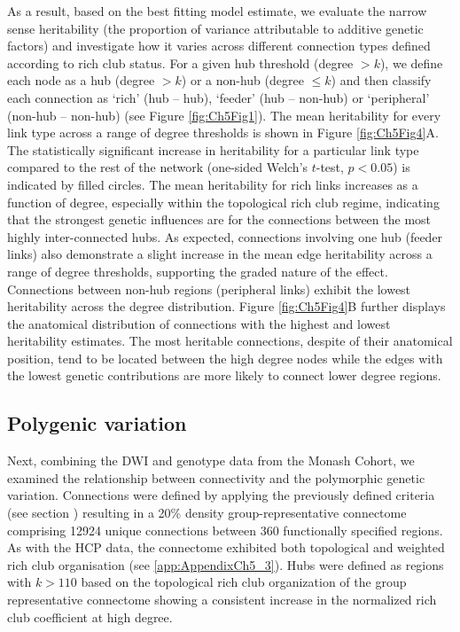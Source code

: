 As a result, based on the best fitting model estimate, we evaluate the narrow sense heritability (the proportion of variance attributable to additive genetic factors) and investigate how it varies across different connection types defined according to rich club status. For a given hub threshold (degree $> k$), we define each node as a hub (degree $> k$) or a non-hub (degree $\leq k$) and then classify each connection as `rich' (hub -- hub), `feeder' (hub -- non-hub) or `peripheral' (non-hub -- non-hub) (see Figure \ref{fig:Ch5Fig1}). The mean heritability for every link type across a range of degree thresholds is shown in Figure \ref{fig:Ch5Fig4}A. The statistically significant increase in heritability for a particular link type compared to the rest of the network (one-sided Welch’s $t$-test, $p < 0.05$) is indicated by filled circles. The mean heritability for rich links increases as a function of degree, especially within the topological rich club regime, indicating that the strongest genetic influences are for the connections between the most highly inter-connected hubs. As expected, connections involving one hub (feeder links) also demonstrate a slight increase in the mean edge heritability across a range of degree thresholds, supporting the graded nature of the effect. Connections between non-hub regions (peripheral links) exhibit the lowest heritability across the degree distribution. Figure \ref{fig:Ch5Fig4}B further displays the anatomical distribution of connections with the highest and lowest heritability estimates. The most heritable connections, despite of their anatomical position, tend to be located between the high degree nodes while the edges with the lowest genetic contributions are more likely to connect lower degree regions.

\subsection{Polygenic variation}

Next, combining the DWI and genotype data from the Monash Cohort, we examined the relationship between connectivity and the polymorphic genetic variation. Connections were defined by applying the previously defined criteria (see section ) resulting in a 20\% density group-representative connectome comprising \num{12924} unique connections between 360 functionally specified regions. As with the HCP data, the connectome exhibited both topological and weighted rich club organisation (see \ref{app:AppendixCh5_3}). Hubs were defined as regions with $k > 110$ based on the topological rich club organization of the group representative connectome showing a consistent increase in the normalized rich club coefficient at high degree.

